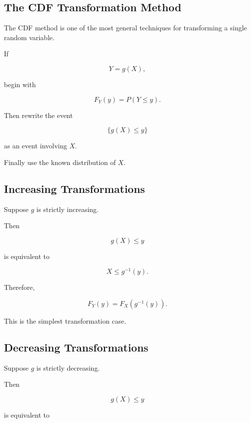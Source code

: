 \subsection{The CDF Transformation Method}
\label{subsec:cdf-transformation-method}

The CDF method is one of the most general techniques for transforming a
single random variable.

If

\[
Y=g(X),
\]

begin with

\[
\boxed{
F_Y(y)
=
P(Y\leq y).
}
\]

Then rewrite the event

\[
\{g(X)\leq y\}
\]

as an event involving \(X\).

Finally use the known distribution of \(X\).

\subsection{Increasing Transformations}
\label{subsec:increasing-transformations}

Suppose \(g\) is strictly increasing.

Then

\[
g(X)\leq y
\]

is equivalent to

\[
X\leq g^{-1}(y).
\]

Therefore,

\[
\boxed{
F_Y(y)
=
F_X(g^{-1}(y)).
}
\]

This is the simplest transformation case.

\subsection{Decreasing Transformations}
\label{subsec:decreasing-transformations}

Suppose \(g\) is strictly decreasing.

Then

\[
g(X)\leq y
\]

is equivalent to

